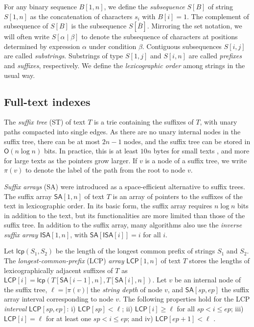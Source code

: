 \documentclass[a4paper,11pt]{llncs}
\newcommand{\abs}[1]{\ensuremath{\lvert #1 \rvert}}
\renewcommand{\complement}[1]{\ensuremath{\overline{ #1 }}}
\newcommand{\ST}{\textsf{ST}}
\newcommand{\SA}{\textsf{SA}}
\newcommand{\mSA}{\ensuremath{\mathsf{SA}}}
\newcommand{\mISA}{\ensuremath{\mathsf{ISA}}}
\newcommand{\LCP}{\textsf{LCP}}
\newcommand{\mLCP}{\ensuremath{\mathsf{LCP}}}
\newcommand{\mlcp}{\ensuremath{\mathsf{lcp}}}
\newcommand{\Oh}{\ensuremath{\mathsf{O}}}
\begin{document}
For any binary sequence $B[1,n]$, we define the \emph{subsequence} $S[B]$ of string $S[1,n]$ as the concatenation of characters $s_{i}$ with $B[i] = 1$. The complement of subsequence of $S[B]$ is the subsequence $S[\complement{B}]$. Mirroring the set notation, we will often write $S[\alpha \mid \beta]$ to denote the subsequence of characters at positions determined by expression $\alpha$ under condition $\beta$. Contiguous subsequences $S[i,j]$ are called \emph{substrings}. Substrings of type $S[1,j]$ and $S[i,n]$ are called \emph{prefixes} and \emph{suffixes}, respectively. We define the \emph{lexicographic order} among strings in the usual way.

\subsection{Full-text indexes}

The \emph{suffix tree} (\ST) \cite{Weiner1973} of text $T$ is a trie containing the suffixes of $T$, with unary paths compacted into single edges. As there are no unary internal nodes in the suffix tree, there can be at most $2n-1$ nodes, and the suffix tree can be stored in $\Oh(n \log n)$ bits. In practice, this is at least $10n$ bytes for small texts \cite{Kurtz1999}, and more for large texts as the pointers grow larger. If $v$ is a node of a suffix tree, we write $\pi(v)$ to denote the label of the path from the root to node $v$.

\emph{Suffix arrays} (\SA) \cite{Manber1993} were introduced as a space-efficient alternative to suffix trees. The suffix array $\mSA[1,n]$ of text $T$ is an array of pointers to the suffixes of the text in lexicographic order. In its basic form, the suffix array requires $n \log n$ bits in addition to the text, but its functionalities are more limited than those of the suffix tree. In addition to the suffix array, many algorithms also use the \emph{inverse suffix array} $\mISA[1,n]$, with $\mSA[\mISA[i]] = i$ for all $i$.

Let $\mlcp(S_{1}, S_{2})$ be the length of the longest common prefix of strings $S_{1}$ and $S_{2}$. The \emph{longest-common-prefix} (\LCP) \emph{array} \cite{Manber1993} $\mLCP[1,n]$ of text $T$ stores the lengths of lexicographically adjacent suffixes of $T$ as $\mLCP[i] = \mlcp(T[\mSA[i-1],n], T[\mSA[i],n])$. Let $v$ be an internal node of the suffix tree, $\ell = \abs{\pi(v)}$ the \emph{string depth} of node $v$, and $\mSA[sp,ep]$ the suffix array interval corresponding to node $v$. The following properties hold for the \LCP{} \emph{interval} $\mLCP[sp,ep]$: i) $\mLCP[sp] < \ell$; ii) $\mLCP[i] \ge \ell$ for all $sp < i \le ep$; iii) $\mLCP[i] = \ell$ for at least one $sp < i \le ep$; and iv) $\mLCP[ep+1] < \ell$ \cite{Abouelhoda2004}.
\end{document}
